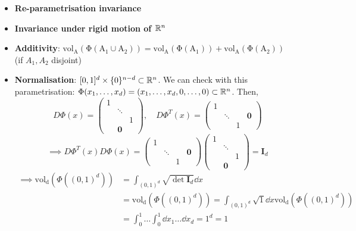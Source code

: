 \documentclass[12pt]{article}
\begin{document}
\begin{itemize}
    \item \textbf{Re-parametrisation invariance}
    \item \textbf{Invariance under rigid motion of $\mathbb{R}^n$}
    \item \textbf{Additivity}: $\mathrm{vol_A(\Phi(A_1 \cup A_2))} = \mathrm{vol_A(\Phi(A_1))} + \mathrm{vol_A(\Phi(A_2))\quad}$ (if $A_1, A_2$ disjoint)
    \item \textbf{Normalisation}: $[0, 1]^d \times \{0\}^{n-d} \subset \mathbb{R}^n$. We can check with this parametrisation: $\Phi(x_1,\dots,x_d) = (x_1,\dots,x_d,0,\dots,0) \subset \mathbb{R}^n$. Then,
    $$
        D \Phi(x) = \begin{pmatrix}
                        1 &        &   \\
                        & \ddots &   \\
                        &        & 1 \\
                        & \mathbf{0} & 
                    \end{pmatrix},\quad
        D \Phi^T(x) = \begin{pmatrix}
                        1 &        &   & \\
                        & \ddots &   & \mathbf{0} \\
                        &        & 1 & 
                    \end{pmatrix}
    $$
    $$
        \implies D \Phi^T(x) D \Phi(x) = \begin{pmatrix}
                        1 &        &   & \\
                        & \ddots &   & \mathbf{0} \\
                        &        & 1 & 
                    \end{pmatrix}\begin{pmatrix}
                        1 &        &   \\
                        & \ddots &   \\
                        &        & 1 \\
                        & \mathbf{0} & 
                    \end{pmatrix} = \mathbf{I}_d
    $$
    $$
    \begin{aligned}
         \implies \mathrm{vol_d}(\Phi\left((0, 1)^d\right)) &= \int_{(0, 1)^d} \sqrt{\det \mathbf{I}_d} \dd x \\
                &= \mathrm{vol_d}(\Phi\left((0, 1)^d\right)) = \int_{(0, 1)^d} \sqrt{1} \dd x \mathrm{vol_d}(\Phi\left((0, 1)^d\right)) \\ 
                &= \int_{0}^{1} \dots \int_{0}^{1} \dd x_1 \dots \dd x_d = 1^d = 1
    \end{aligned}
    $$
\end{itemize}
\end{document}
